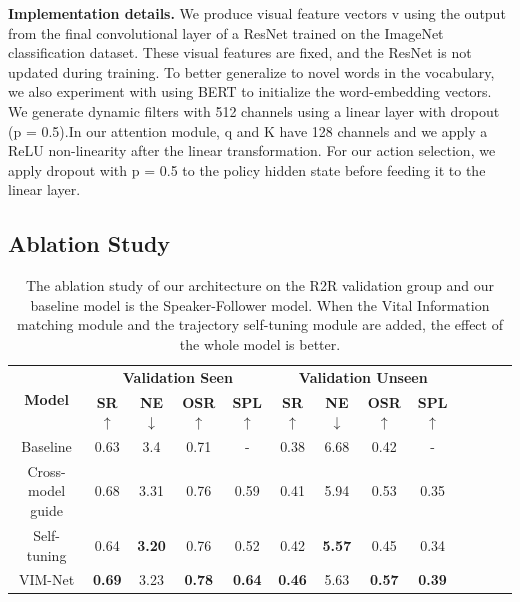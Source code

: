 \textbf{Implementation details.} We produce visual feature vectors v using the output from the final convolutional layer of a ResNet trained on the ImageNet classification dataset. These visual features are fixed, and the ResNet is not updated during training. To better generalize to novel words in the vocabulary, we also experiment with using BERT to initialize the word-embedding vectors. We generate dynamic filters with 512 channels using a linear layer with dropout (p = 0.5).In our attention module, q and K have 128 channels and we apply a ReLU non-linearity after the linear transformation. For our action selection, we apply dropout with p = 0.5 to the policy hidden state before feeding it to the linear layer.
\vspace{-2em}
\subsection{Ablation Study}
\vspace{-2em}
\begin{table}[h]
	\centering
	\caption{The ablation study of our architecture on the R2R validation group and our baseline model is the Speaker-Follower model. When the Vital Information matching module and the trajectory self-tuning module are added, the effect of the whole model is better.}
	{\begin{tabular}[c]{ccccccccccccc}
			\toprule[1pt]
			\multirow{2}{*}{{\textbf{Model}}} & \multicolumn{4}{c}{{\textbf{Validation Seen}}} & \multicolumn{4}{c}{{\textbf{Validation Unseen}}}\\
			
			& \textbf{SR}$\uparrow$ & \textbf{NE}$\downarrow$ & \textbf{OSR}$\uparrow$ & \textbf{SPL}$\uparrow$	& \textbf{SR}$\uparrow$ & \textbf{NE}$\downarrow$ & \textbf{OSR}$\uparrow$ & \textbf{SPL}$\uparrow$ & \\
			\toprule[1pt]
			
			Baseline   & 0.63 & 3.4 & 0.71 & - & 0.38 & 6.68 & 0.42 & -\\
			Cross-model guide  & 0.68 &  3.31 &  0.76 & 0.59 & 0.41 & 5.94 & 0.53  & 0.35 \\
			Self-tuning    & 0.64 & \textbf{3.20} & 0.76 & 0.52 & 0.42 & \textbf{5.57} & 0.45 & 0.34 \\
			VIM-Net & \textbf{0.69} &  3.23 & \textbf{0.78} & \textbf{0.64} & \textbf{0.46} & 5.63 & \textbf{0.57} & \textbf{0.39} \\
			
			\bottomrule[1pt]
		\end{tabular}
		\label{table_1}}
\end{table}
